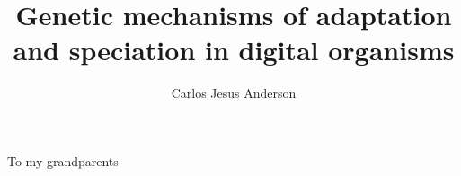 \documentclass{msuphddissertation}
\title{Genetic mechanisms of adaptation\protect\\
  and speciation in digital organisms}
\author{Carlos Jesus Anderson}
\begin{document}
\maketitlepage



\begin{copyrt}
\centering
\end{copyrt}

\begin{dedication} 
\centering To my grandparents
\end{dedication}



\TOC
\LOT
\LOF

\newpage
{}










\end{document}
